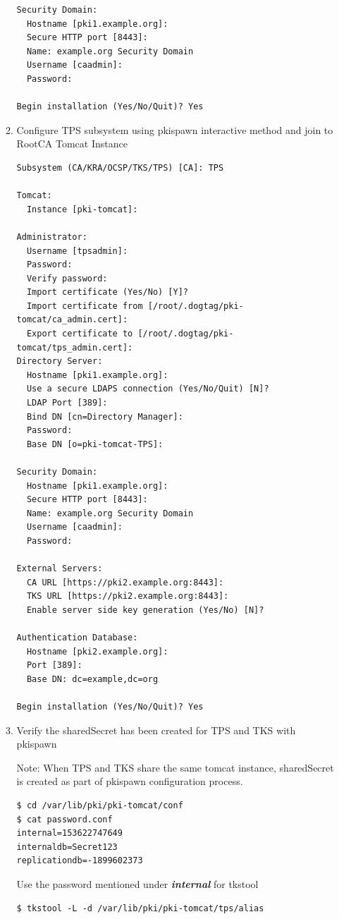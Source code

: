 \documentclass[12pt]{report}
\begin{document}
\begin{enumerate}[label*=\arabic*.]
\begin{enumerate}[label*=\arabic*.]
\begin{lstlisting}
Security Domain:
  Hostname [pki1.example.org]:
  Secure HTTP port [8443]:
  Name: example.org Security Domain
  Username [caadmin]:
  Password:

Begin installation (Yes/No/Quit)? Yes
                    \end{lstlisting}
                \item \label {shared_tps} Configure TPS subsystem using pkispawn interactive method and join to RootCA Tomcat Instance
                    \begin{lstlisting}
Subsystem (CA/KRA/OCSP/TKS/TPS) [CA]: TPS

Tomcat:
  Instance [pki-tomcat]: 

Administrator:
  Username [tpsadmin]: 
  Password: 
  Verify password: 
  Import certificate (Yes/No) [Y]? 
  Import certificate from [/root/.dogtag/pki-tomcat/ca_admin.cert]: 
  Export certificate to [/root/.dogtag/pki-tomcat/tps_admin.cert]: 
Directory Server:
  Hostname [pki1.example.org]: 
  Use a secure LDAPS connection (Yes/No/Quit) [N]? 
  LDAP Port [389]: 
  Bind DN [cn=Directory Manager]: 
  Password: 
  Base DN [o=pki-tomcat-TPS]: 

Security Domain:
  Hostname [pki1.example.org]: 
  Secure HTTP port [8443]: 
  Name: example.org Security Domain
  Username [caadmin]: 
  Password: 

External Servers:
  CA URL [https://pki2.example.org:8443]: 
  TKS URL [https://pki2.example.org:8443]: 
  Enable server side key generation (Yes/No) [N]? 

Authentication Database:
  Hostname [pki2.example.org]: 
  Port [389]: 
  Base DN: dc=example,dc=org

Begin installation (Yes/No/Quit)? Yes
                    \end{lstlisting}
                \item \label{shared_tps_secret} Verify the sharedSecret has been created for TPS and TKS with pkispawn 

                    Note: When TPS and TKS share the same tomcat instance, sharedSecret is created
                    as part of pkispawn configuration process.
                    \begin{lstlisting}[style=bashInputStyle]
$ cd /var/lib/pki/pki-tomcat/conf
$ cat password.conf
internal=153622747649
internaldb=Secret123
replicationdb=-1899602373
                    \end{lstlisting}
                    Use the password mentioned under \textit{\textbf{internal}} for tkstool 
                    \begin{lstlisting}[style=bashInputStyle]
$ tkstool -L -d /var/lib/pki/pki-tomcat/tps/alias


\end{lstlisting}
\end{enumerate}
\end{enumerate}
\end{document}
